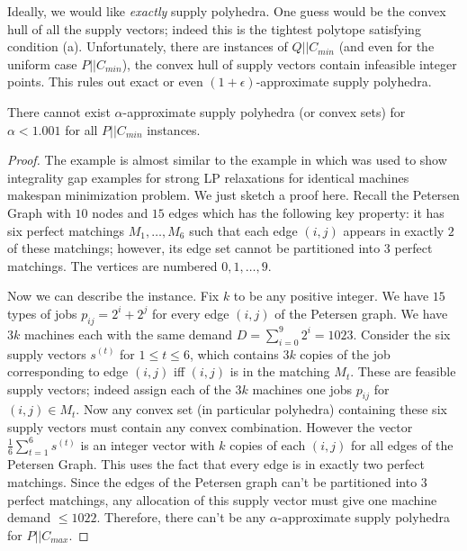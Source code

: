 Ideally, we would like {\em exactly} supply polyhedra. One guess would be the convex hull of all the supply vectors; indeed this is the tightest polytope satisfying condition (a).
Unfortunately, there are instances of $Q||C_{min}$ (and even for the uniform case $P||C_{min}$), the convex hull of supply vectors contain infeasible integer points. 
This rules out exact or even $(1+\epsilon)$-approximate supply polyhedra.
\begin{theorem}\label{thm:no-supp}
	There cannot exist $\alpha$-approximate supply polyhedra (or convex sets) for $\alpha < 1.001$ for all  $P||C_{min}$ instances.
\end{theorem}
\begin{proof}
The example is almost similar to the example in \cite{claire mathieu et al ipco 2016} which was used to show integrality gap examples for strong LP relaxations for identical machines makespan minimization problem.
We just sketch a proof here. Recall the Petersen Graph with $10$ nodes and $15$ edges which has the following key property: it has six perfect matchings $M_1,\ldots,M_6$ such that each edge $(i,j)$ appears in exactly $2$ of these matchings; however, its edge set cannot be partitioned into $3$ perfect matchings.
The vertices are numbered $0,1,\ldots,9$. 

Now we can describe the instance. Fix $k$ to be any positive integer.
We have $15$ types of jobs $p_{ij} = 2^i + 2^j$ for every edge $(i,j)$ of the Petersen graph.
We have $3k$ machines each with the same demand $D = \sum_{i=0}^9 2^i = 1023$.
Consider the six supply vectors $s^{(t)}$ for $1\leq t\leq 6$,  which contains $3k$ copies of the job corresponding to edge $(i,j)$ iff $(i,j)$ is in the matching $M_t$.
These are feasible supply vectors; indeed assign each of the $3k$ machines one jobs $p_{ij}$ for $(i,j) \in M_t$. Now any convex set (in particular polyhedra) containing these six supply vectors
must contain any convex combination. However the vector $\frac{1}{6}\sum_{t=1}^6 s^{(t)}$ is an integer vector with $k$ copies of each $(i,j)$ for all edges of the Petersen Graph.
This uses the fact that every edge is in exactly two perfect matchings. Since the edges of the  Petersen graph can't be partitioned into $3$ perfect matchings, any allocation of this supply vector
must give one machine demand $\leq 1022$. Therefore, there can't be any $\alpha$-approximate supply polyhedra for $P||C_{max}$.
\end{proof}

